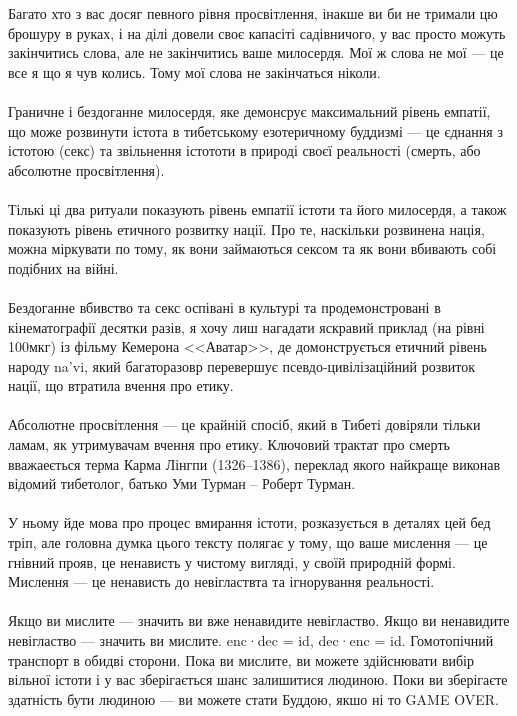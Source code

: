 Багато хто з вас досяг певного рівня просвітлення, інакше ви би не тримали цю брошуру в руках,
і на ділі довели своє капасіті садівничого, у вас просто можуть закінчитись слова, але не закінчитись
ваше милосердя. Мої ж слова не мої --- це все я що я чув колись. Тому мої слова не закінчаться ніколи.
\\
\\
Граничне і бездоганне милосердя, яке демонсрує максимальний рівень емпатії, що може розвинути істота
в тибетському езотеричному буддизмі --- це єднання з істотою (секс) та звільнення істототи в природі
своєї реальності (смерть, або абсолютне просвітлення).
\\
\\
Тількі ці два ритуали показують рівень емпатії істоти та його милосердя, а також показують
рівень етичного розвитку нації. Про те, наскільки розвинена нація, можна міркувати по тому, як
вони займаються сексом та як вони вбивають собі подібних на війні.
\\
\\
Бездоганне вбивство та секс оспівані в культурі та продемонстровані в кінематографії десятки разів,
я хочу лиш нагадати яскравий приклад (на рівні 100мкг) із фільму Кемерона <<Аватар>>, де домонструється
етичний рівень народу  na'vi, який багаторазовр перевершує псевдо-цивілізаційний розвиток нації,
що втратила вчення про етику.
\\
\\
Абсолютне просвітлення --- це крайній спосіб, який в Тибеті довіряли тільки ламам,
як утримувачам вчення про етику. Ключовий трактат про смерть вважаеється терма Карма Лінгпи (1326–1386),
переклад якого найкраще виконав відомий тибетолог, батько Уми Турман -- Роберт Турман.
\\
\\
У ньому йде мова про процес вмирання істоти, розказується в деталях цей бед тріп,
але головна думка цього тексту полягає у тому, що ваше мислення --- це гнівний прояв,
це ненависть у чистому вигляді, у своїй природній формі. Мислення --- це ненависть до невігластвта та
ігнорування реальності.
\\
\\
Якщо ви мислите --- значить ви вже ненавидите невігластво. Якщо ви ненавидите невігластво --- значить ви мислите.
enc·dec = id, dec·enc = id. Гомотопічний транспорт в обидві сторони. Пока ви мислите, ви можете
здійснювати вибір вільної істоти і у вас зберігається шанс залишитися людиною. Поки ви зберігаєте
здатність бути людиною --- ви можете стати Буддою, якшо ні то GAME OVER.

